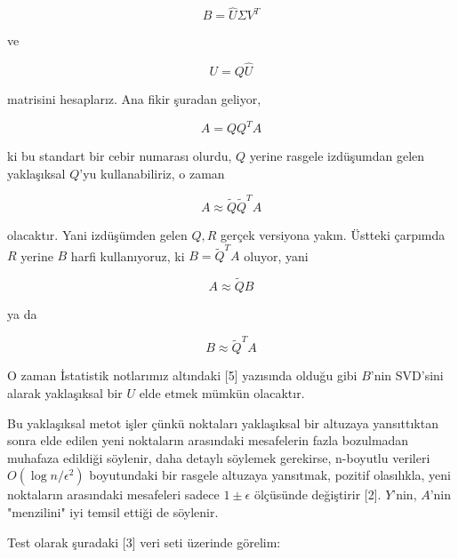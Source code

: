 \documentclass[12pt,fleqn]{article}\usepackage{../../common}
\begin{document}
$$ B = \hat{U}\Sigma V^T $$

ve

$$ U = Q\hat{U} $$

matrisini hesaplarız. Ana fikir şuradan geliyor,

$$ A = QQ^TA $$

ki bu standart bir cebir numarası olurdu, $Q$ yerine rasgele
izdüşumdan gelen yaklaşıksal $Q$'yu kullanabiliriz, o zaman

$$ A \approx \tilde{Q}\tilde{Q}^TA $$

olacaktır. Yani izdüşümden gelen $Q,R$ gerçek versiyona yakın. Üstteki
çarpımda $R$ yerine $B$ harfi kullanıyoruz, ki $B = \tilde{Q}^T A$
oluyor, yani

$$ A \approx \tilde{Q}B $$

ya da 

$$ B \approx \tilde{Q}^T A $$

O zaman İstatistik notlarımız altındaki [5] yazısında olduğu gibi $B$'nin
SVD'sini alarak yaklaşıksal bir $U$ elde etmek mümkün olacaktır.

Bu yaklaşıksal metot işler çünkü noktaları yaklaşıksal bir altuzaya
yansıttıktan sonra elde edilen yeni noktaların arasındaki mesafelerin
fazla bozulmadan muhafaza edildiği söylenir, daha detaylı söylemek
gerekirse, n-boyutlu verileri $O(\log n / \epsilon^2)$ boyutundaki bir
rasgele altuzaya yansıtmak, pozitif olasılıkla, yeni noktaların
arasındaki mesafeleri sadece $1 \pm \epsilon$ ölçüsünde değiştirir
[2]. $Y$'nin, $A$'nin "menzilini" iyi temsil ettiği de söylenir.

Test olarak şuradaki [3] veri seti üzerinde görelim:
\end{document}
